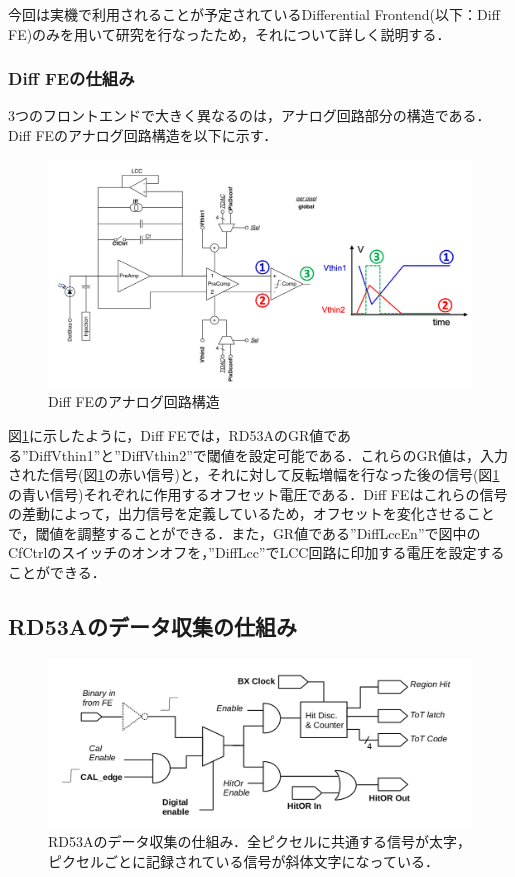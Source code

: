 今回は実機で利用されることが予定されているDifferential Frontend(以下：Diff FE)のみを用いて研究を行なったため，それについて詳しく説明する．

\subsubsection*{Diff FEの仕組み}
3つのフロントエンドで大きく異なるのは，アナログ回路部分の構造である．Diff FEのアナログ回路構造を以下に示す．\par

\begin{figure}[h]
\centering
\includegraphics[width=12cm]{./figure/RD53A_DiffFE.png}
\caption{Diff FEのアナログ回路構造}
\label{fig:DiffFE}
\end{figure}

図\ref{fig:DiffFE}に示したように，Diff FEでは，RD53AのGR値である''DiffVthin1''と''DiffVthin2''で閾値を設定可能である．これらのGR値は，入力された信号(図\ref{fig:DiffFE}の赤い信号)と，それに対して反転増幅を行なった後の信号(図\ref{fig:DiffFE}の青い信号)それぞれに作用するオフセット電圧である．Diff FEはこれらの信号の差動によって，出力信号を定義しているため，オフセットを変化させることで，閾値を調整することができる．また，GR値である''DiffLccEn''で図中のCfCtrlのスイッチのオンオフを，''DiffLcc''でLCC回路に印加する電圧を設定することができる．

\subsection{RD53Aのデータ収集の仕組み}

\begin{figure}[h]
  \centering
  \includegraphics[width=13cm]{./figure/RD53Aproc.png}
  \caption{RD53Aのデータ収集の仕組み．全ピクセルに共通する信号が太字，ピクセルごとに記録されている信号が斜体文字になっている．}
  \label{fig:RD53Aproc}
\end{figure}

